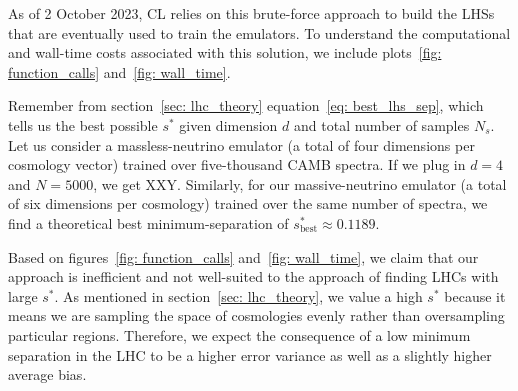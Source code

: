 

As of 2 October 2023, CL relies on this brute-force approach to build the
LHSs that are eventually used to train the emulators. To understand the 
computational and wall-time costs associated with this solution, we include 
plots~\ref{fig: function_calls} and~\ref{fig: wall_time}.

\begin{comment} %
we left the system to run for three consecutive days. In this time, the 
largest minimum separation that we generated was approximately 0.08022.  
Recall from section sec_B1 that the theoretical best possible value for this 
setup is approximately 0.24183. It would have been more meaningful if you had 
counted the total number of function calls, but it isn’t too late to set up 
such a run. So, even after assigning a relatively large amount of compute to 
this brute force solution, we fail to obtain an LHC of even a third of the 
best minimum separation.
\end{comment} 

Remember from section~\ref{sec: lhc_theory} equation~\ref{eq: best_lhs_sep},
which tells us the best possible $s^*$
given dimension $d$ and total number of samples $N_s$. Let us consider a 
massless-neutrino emulator (a total of four dimensions per cosmology vector)
trained over five-thousand CAMB spectra. If we plug in $d = 4$ and $N=5000$,
we get XXY. Similarly, for our massive-neutrino emulator (a total of six 
dimensions per cosmology) trained over the same number of spectra, we find a 
theoretical best minimum-separation of $s^*_\text{best} \approx 0.1189$.

Based on figures~\ref{fig: function_calls} and~\ref{fig: wall_time}, we
claim that our approach is
inefficient and not well-suited to the approach of finding LHCs with large
$s^*$. As mentioned in section~\ref{sec: lhc_theory},
we value a high $s^*$ because it means we are sampling the
space of cosmologies evenly rather than oversampling particular regions.
Therefore, we expect the consequence of a low minimum separation in the LHC to
be a higher error variance as well as a slightly higher average bias.

